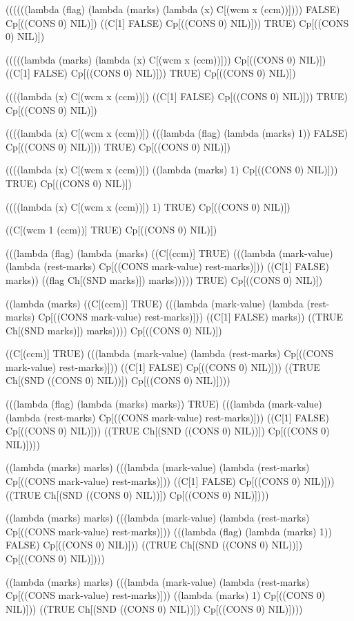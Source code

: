 \documentclass{llncs}
\begin{document}
\begin{schemedisplay}
((((((lambda (flag) (lambda (marks) (lambda (x) C[(wcm x (ccm))]))) FALSE) Cp[((CONS 0) NIL)])
   ((C[1] FALSE) Cp[((CONS 0) NIL)]))
  TRUE) Cp[((CONS 0) NIL)])

(((((lambda (marks) (lambda (x) C[(wcm x (ccm))])) Cp[((CONS 0) NIL)])
   ((C[1] FALSE) Cp[((CONS 0) NIL)]))
  TRUE) Cp[((CONS 0) NIL)])

((((lambda (x) C[(wcm x (ccm))])
   ((C[1] FALSE) Cp[((CONS 0) NIL)]))
  TRUE) Cp[((CONS 0) NIL)])

((((lambda (x) C[(wcm x (ccm))])
   (((lambda (flag) (lambda (marks) 1)) FALSE) Cp[((CONS 0) NIL)]))
  TRUE) Cp[((CONS 0) NIL)])

((((lambda (x) C[(wcm x (ccm))])
   ((lambda (marks) 1) Cp[((CONS 0) NIL)]))
  TRUE) Cp[((CONS 0) NIL)])

((((lambda (x) C[(wcm x (ccm))])
   1) TRUE) Cp[((CONS 0) NIL)])

((C[(wcm 1 (ccm))]
   TRUE) Cp[((CONS 0) NIL)])

(((lambda (flag)
    (lambda (marks)
      ((C[(ccm)] TRUE)
       (((lambda (mark-value) (lambda (rest-marks) Cp[((CONS mark-value) rest-marks)]))
         ((C[1] FALSE) marks))
        ((flag Ch[(SND marks)]) marks)))))
  TRUE) Cp[((CONS 0) NIL)])

((lambda (marks)
   ((C[(ccm)] TRUE)
    (((lambda (mark-value) (lambda (rest-marks) Cp[((CONS mark-value) rest-marks)]))
      ((C[1] FALSE) marks))
     ((TRUE Ch[(SND marks)]) marks))))
 Cp[((CONS 0) NIL)])

((C[(ccm)] TRUE)
 (((lambda (mark-value) (lambda (rest-marks) Cp[((CONS mark-value) rest-marks)]))
   ((C[1] FALSE) Cp[((CONS 0) NIL)]))
  ((TRUE Ch[(SND ((CONS 0) NIL))]) Cp[((CONS 0) NIL)])))

(((lambda (flag) (lambda (marks) marks))
  TRUE)
 (((lambda (mark-value) (lambda (rest-marks) Cp[((CONS mark-value) rest-marks)]))
   ((C[1] FALSE) Cp[((CONS 0) NIL)]))
  ((TRUE Ch[(SND ((CONS 0) NIL))]) Cp[((CONS 0) NIL)])))

((lambda (marks) marks)
 (((lambda (mark-value) (lambda (rest-marks) Cp[((CONS mark-value) rest-marks)]))
   ((C[1] FALSE) Cp[((CONS 0) NIL)]))
  ((TRUE Ch[(SND ((CONS 0) NIL))]) Cp[((CONS 0) NIL)])))

((lambda (marks) marks)
 (((lambda (mark-value) (lambda (rest-marks) Cp[((CONS mark-value) rest-marks)]))
   (((lambda (flag) (lambda (marks) 1)) FALSE) Cp[((CONS 0) NIL)]))
  ((TRUE Ch[(SND ((CONS 0) NIL))]) Cp[((CONS 0) NIL)])))

((lambda (marks) marks)
 (((lambda (mark-value) (lambda (rest-marks) Cp[((CONS mark-value) rest-marks)]))
   ((lambda (marks) 1) Cp[((CONS 0) NIL)]))
  ((TRUE Ch[(SND ((CONS 0) NIL))]) Cp[((CONS 0) NIL)])))


\end{schemedisplay}
\end{document}

